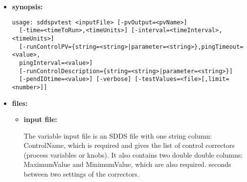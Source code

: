 \begin{itemize}
\item {\bf synopsis:} 
%
%
\begin{verbatim}
usage: sddspvtest <inputFile> [-pvOutput=<pvName>] 
  [-time=<timeToRun>,<timeUnits>] [-interval=<timeInterval>,<timeUnits>] 
  [-runControlPV={string=<string>|parameter=<string>},pingTimeout=<value>,
  pingInterval=<value>] 
  [-runControlDescription={string=<string>|parameter=<string>}] 
  [-pendIOtime=<value>] [-verbose] [-testValues=<file>[,limit=<number>]]
\end{verbatim}
\item {\bf files:}
\begin{itemize}
\item {\bf input file:} \par
The variable input file is an SDDS file with one string column: ControlName, which is required
and gives the list of control correctors (process variables or knobs). It also contains two double
double columns: MaximumValue and MinimumValue, which are also required.
seconds between two settings of the correctors.
\end{itemize}


\end{itemize}
